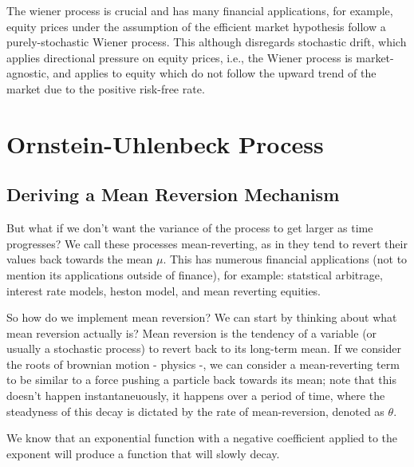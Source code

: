 \documentclass{article}
\begin{document}
\begin{spacing}{2.0}
The wiener process is crucial and has many financial applications, for example, equity prices under the assumption of the efficient
market hypothesis follow a purely-stochastic Wiener process. This although disregards stochastic drift, which applies directional
pressure on equity prices, i.e., the Wiener process is market-agnostic, and applies to equity which do not follow the upward trend
of the market due to the positive risk-free rate.


\section{Ornstein-Uhlenbeck Process}

\subsection{Deriving a Mean Reversion Mechanism}

But what if we don't want the variance of the process to get larger as time progresses? We call these processes mean-reverting, as in they
tend to revert their values back towards the mean $\mu$. This has numerous financial applications (not to mention its applications outside
of finance), for example: statstical arbitrage, interest rate models, heston model, and mean reverting equities.

So how do we implement mean reversion? We can start by thinking about what mean reversion actually is? Mean reversion is the tendency of a
variable (or usually a stochastic process) to revert back to its long-term mean. If we consider the roots of brownian motion - physics -, we
can consider a mean-reverting term to be similar to a force pushing a particle back towards its mean; note that this doesn't happen
instantaneuously, it happens over a period of time, where the steadyness of this decay is dictated by the rate of mean-reversion, denoted as
$\theta$.

We know that an exponential function with a negative coefficient applied to the exponent will produce a function that will slowly decay.

\begin{center}
\end{center}
\end{spacing}
\end{document}
